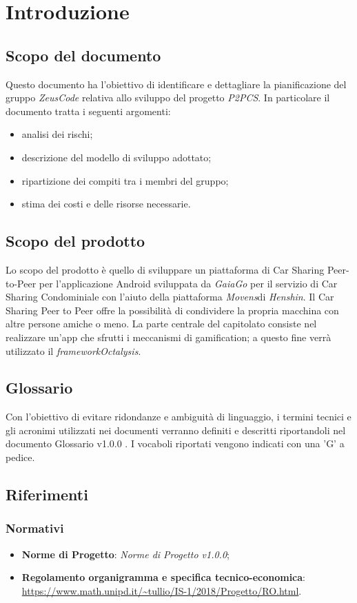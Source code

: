 \section{Introduzione}
\subsection{Scopo del documento}
Questo documento ha l’obiettivo di identificare e dettagliare la pianificazione del gruppo \textit{ZeusCode} relativa allo sviluppo del progetto \textit{P2PCS}. In particolare il documento tratta i seguenti argomenti:
\begin{itemize}
	\item analisi dei rischi;
	\item descrizione del modello di sviluppo adottato;
	\item ripartizione dei compiti tra i membri del gruppo;
	\item stima dei costi e delle risorse necessarie.
\end{itemize}
\subsection{Scopo del prodotto}
Lo scopo del prodotto è quello di sviluppare un piattaforma di Car Sharing Peer-to-Peer per l'applicazione Android sviluppata da \textit{GaiaGo} per il servizio di Car Sharing Condominiale con l'aiuto della piattaforma \textit{Movens}\glosp di \textit{Henshin}\glo. Il Car Sharing Peer to Peer offre la possibilità di condividere la propria macchina con altre persone amiche o meno. La parte centrale del
capitolato consiste nel realizzare un'app che sfrutti i meccanismi di gamification\glo; a questo fine
verrà utilizzato il \textit{framework}\glosp \textit{Octalysis}\glo.
\subsection{Glossario}
Con l'obiettivo di evitare ridondanze e ambiguità di linguaggio, i termini tecnici e gli acronimi
utilizzati nei documenti verranno definiti e descritti riportandoli nel documento Glossario v1.0.0 .
I vocaboli riportati vengono indicati con una 'G' a pedice.
\subsection{Riferimenti}
\subsubsection{Normativi}
\begin{itemize}
	\item \textbf{Norme di Progetto}: \textit{Norme di Progetto v1.0.0};
	\item \textbf{Regolamento organigramma e specifica tecnico-economica}: \\
	\url{https://www.math.unipd.it/~tullio/IS-1/2018/Progetto/RO.html}.
\end{itemize}

